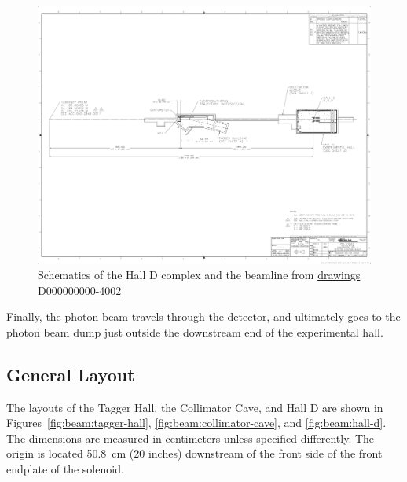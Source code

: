 \begin{figure}[h]
\begin{center}
   \includegraphics[page=1,viewport=1001 991 3020 1700,clip,angle=0,width=0.98\linewidth]{figures/D000000000-4002_RevB}
\end{center}
\caption{Schematics of the Hall D complex and the beamline 
         from \href{https://misportal.jlab.org/jlabDocs/document.seam?id=80930}{drawings D000000000-4002}
        }
\label{fig:beam:halld-tot} 
\end{figure}

Finally, the photon beam travels through the \GX{} detector, and
ultimately goes to the photon beam dump just outside the downstream
end of the experimental hall.

\subsection[General Layout (draft)]{General Layout 
  \label{sec:beamline:layout}
}

The layouts of the Tagger Hall, the Collimator Cave, and Hall D are shown in Figures~\ref{fig:beam:tagger-hall},
\ref{fig:beam:collimator-cave}, and \ref{fig:beam:hall-d}. The dimensions are measured in centimeters unless
specified differently. The origin is located 50.8~cm (20 inches) downstream of the front side of the
front endplate of the solenoid. 


